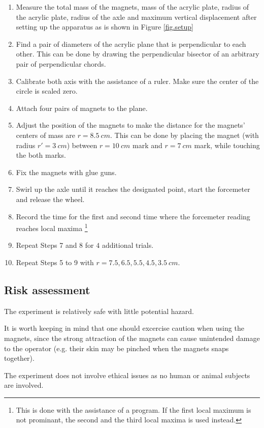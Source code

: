 \documentclass[a4paper]{article}
\begin{document}
\begin{enumerate}
    \item Measure the total mass of the magnets, mass of the acrylic plate, radius of the acrylic plate, radius of the axle and maximum vertical displacement after setting up the apparatus as is shown in Figure \ref{fig.setup}
    \item Find a pair of diameters of the acrylic plane that is perpendicular to each other. This can be done by drawing the perpendicular bisector of an arbitrary pair of perpendicular chords. 
    \item Calibrate both axis with the assistance of a ruler. Make sure the center of the circle is scaled zero. 
    \item Attach four pairs of magnets to the plane.
    \item Adjust the position of the magnets to make the distance for the magnets' centers of mass are $r = \SI{8.5}{cm}$. This can be done by placing the magnet (with radius $r' = \SI{3}{cm}$) between $r = \SI{10}{cm}$ mark and $r = \SI{7}{cm}$ mark, while touching the both marks.
    \item Fix the magnets with glue guns.
    \item Swirl up the axle until it reaches the designated point, start the forcemeter and release the wheel. 
    \item Record the time for the first and second time where the forcemeter reading reaches local maxima \footnote{This is done with the assistance of a program. If the first local maximum is not prominant, the second and the third local maxima is used instead.} 
    \item Repeat Steps 7 and 8 for $4$ additional trials.
    \item Repeat Steps 5 to 9 with $r = 7.5, 6.5, 5.5, 4.5, 3.5 \SI{}{cm}$.
\end{enumerate}

\subsection{Risk assessment}

The experiment is relatively safe with little potential hazard. 

It is worth keeping in mind that one should excercise caution when using the magnets, since the strong attraction of the magnets can cause unintended damage to the operator (e.g. their skin may be pinched when the magnets snaps together).

The experiment does not involve ethical issues as no human or animal subjects are involved.
\end{document}
